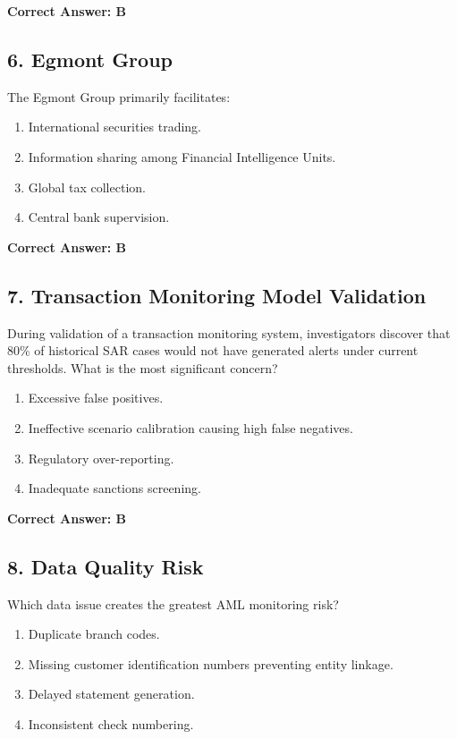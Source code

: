 \documentclass[11pt,a4paper]{article}
\begin{document}
	\textbf{Correct Answer: B}
	
	\subsection{6. Egmont Group}
	
	The Egmont Group primarily facilitates:
	
	\begin{enumerate}[label=\Alph*.]
		\item International securities trading.
		\item Information sharing among Financial Intelligence Units.
		\item Global tax collection.
		\item Central bank supervision.
	\end{enumerate}
	
	\textbf{Correct Answer: B}
	
	\subsection{7. Transaction Monitoring Model Validation}
	
	During validation of a transaction monitoring system, investigators discover that 80\% of historical SAR cases would not have generated alerts under current thresholds. What is the most significant concern?
	
	\begin{enumerate}[label=\Alph*.]
		\item Excessive false positives.
		\item Ineffective scenario calibration causing high false negatives.
		\item Regulatory over-reporting.
		\item Inadequate sanctions screening.
	\end{enumerate}
	
	\textbf{Correct Answer: B}
	
	\subsection{8. Data Quality Risk}
	
	Which data issue creates the greatest AML monitoring risk?
	
	\begin{enumerate}[label=\Alph*.]
		\item Duplicate branch codes.
		\item Missing customer identification numbers preventing entity linkage.
		\item Delayed statement generation.
		\item Inconsistent check numbering.
	\end{enumerate}
	
\end{document}
